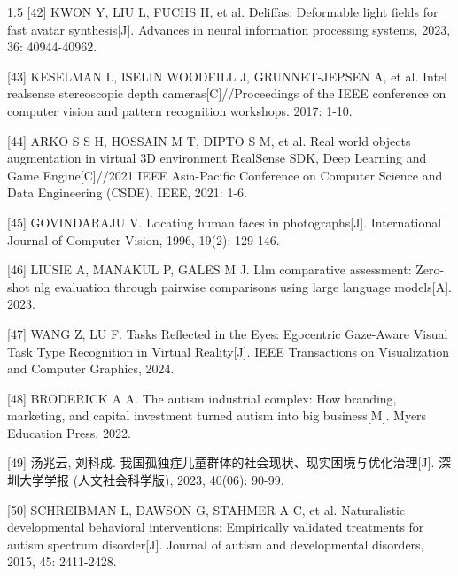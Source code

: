 \documentclass[zihao=-4]{ctexart}
\begin{document}
\begin{spacing}{1.5}
[42] KWON Y, LIU L, FUCHS H, et al. Deliffas: Deformable light fields for fast avatar synthesis[J]. Advances in neural information processing systems, 2023, 36: 40944-40962.

[43] KESELMAN L, ISELIN WOODFILL J, GRUNNET-JEPSEN A, et al. Intel realsense stereoscopic depth cameras[C]//Proceedings of the IEEE conference on computer vision and pattern recognition workshops. 2017: 1-10.

[44] ARKO S S H, HOSSAIN M T, DIPTO S M, et al. Real world objects augmentation in virtual 3D environment RealSense SDK, Deep Learning and Game Engine[C]//2021 IEEE Asia-Pacific Conference on Computer Science and Data Engineering (CSDE). IEEE, 2021: 1-6.

[45] GOVINDARAJU V. Locating human faces in photographs[J]. International Journal of Computer Vision, 1996, 19(2): 129-146.

[46] LIUSIE A, MANAKUL P, GALES M J. Llm comparative assessment: Zero-shot nlg evaluation through pairwise comparisons using large language models[A]. 2023.

[47] WANG Z, LU F. Tasks Reflected in the Eyes: Egocentric Gaze-Aware Visual Task Type Recognition in Virtual Reality[J]. IEEE Transactions on Visualization and Computer Graphics, 2024.

[48] BRODERICK A A. The autism industrial complex: How branding, marketing, and capital investment turned autism into big business[M]. Myers Education Press, 2022.

[49] 汤兆云, 刘科成. 我国孤独症儿童群体的社会现状、现实困境与优化治理[J]. 深圳大学学报 (人文社会科学版), 2023, 40(06): 90-99.

[50] SCHREIBMAN L, DAWSON G, STAHMER A C, et al. Naturalistic developmental behavioral interventions: Empirically validated treatments for autism spectrum disorder[J]. Journal of autism and developmental disorders, 2015, 45: 2411-2428.

\end{spacing}
\end{document}
